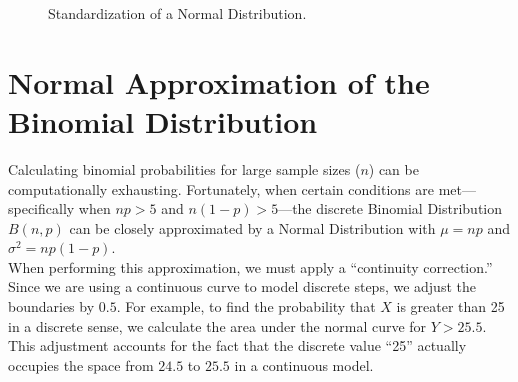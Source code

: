\documentclass[12pt]{scrartcl}
\begin{document}
\begin{figure}[H]
	\centering
	\caption{Standardization of a Normal Distribution.}
\end{figure}

\newpage
\section{Normal Approximation of the Binomial Distribution}

Calculating binomial probabilities for large sample sizes ($n$) can be computationally exhausting. Fortunately, when certain conditions are met---specifically when $np > 5$ and $n(1-p) > 5$---the discrete Binomial Distribution $B(n, p)$ can be closely approximated by a Normal Distribution with $\mu = np$ and $\sigma^2 = np(1-p)$. \\

When performing this approximation, we must apply a ``continuity correction.'' Since we are using a continuous curve to model discrete steps, we adjust the boundaries by $0.5$. For example, to find the probability that $X$ is greater than 25 in a discrete sense, we calculate the area under the normal curve for $Y > 25.5$. This adjustment accounts for the fact that the discrete value ``25'' actually occupies the space from $24.5$ to $25.5$ in a continuous model.
\end{document}
